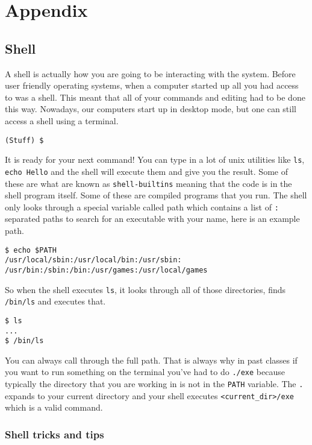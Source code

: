 \chapter{Appendix}

\section{Shell}

A shell is actually how you are going to be interacting with the system. Before user friendly operating systems, when a computer started up all you had access to was a shell. This meant that all of your commands and editing had to be done this way. Nowadays, our computers start up in desktop mode, but one can still access a shell using a terminal.

\begin{verbatim}
(Stuff) $
\end{verbatim}

It is ready for your next command! You can type in a lot of unix utilities like \texttt{ls}, \texttt{echo\ Hello} and the shell will execute them and give you the result. Some of these are what are known as \texttt{shell-builtins} meaning that the code is in the shell program itself. Some of these are compiled programs that you run. The shell only looks through a special variable called path which contains a list of \texttt{:} separated paths to search for an executable with your name, here is an example path.

\begin{verbatim}
$ echo $PATH
/usr/local/sbin:/usr/local/bin:/usr/sbin:
/usr/bin:/sbin:/bin:/usr/games:/usr/local/games
\end{verbatim}

So when the shell executes \texttt{ls}, it looks through all of those directories, finds \texttt{/bin/ls} and executes that.

\begin{verbatim}
$ ls
...
$ /bin/ls
\end{verbatim}

You can always call through the full path. That is always why in past classes if you want to run something on the terminal you've had to do \texttt{./exe} because typically the directory that you are working in is not in the \texttt{PATH} variable. The \texttt{.} expands to your current directory and your shell executes \texttt{\textless{}current\_dir\textgreater{}/exe} which is a valid command.

\subsection{Shell tricks and tips}

